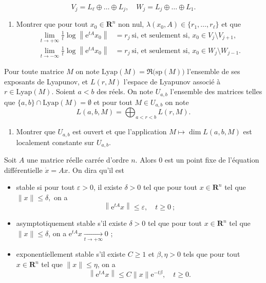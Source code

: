 \documentclass[a4paper,10pt,openany]{article}
\theoremstyle{plain}
\theoremstyle{definition}
\newcommand{\e}{\mathrm{e}}
\newcommand{\R}{\mathbf{R}}
\begin{document}
$$
V_{j} =L_{\ell} \oplus \ldots \oplus L_{j}, \quad W_{j} =L_{j} \oplus \ldots \oplus L_{1}.
$$
\begin{enumerate}[resume]
\item Montrer que pour tout $x_0 \in \R^n$ non nul, $\lambda(x_0, A) \in \{r_1, \dots, r_\ell\}$ et que
$$
\begin{aligned}
\lim_{t \to + \infty} \frac{1}{t} \log \left\|\e^{tA} x_0 \right\| &= r_j ~\text{si, et seulement si, } x_0 \in V_j \setminus V_{j+1}, \\
\lim_{t \to - \infty} \frac{1}{t} \log \left\|\e^{tA} x_0 \right\| &= r_j ~\text{si, et seulement si, } x_0 \in W_j \setminus W_{j-1}.
\end{aligned}
$$
\end{enumerate}
Pour toute matrice $M$ on note $\mathrm{Lyap}(M) = \Re\bigl(\mathrm{sp}(M)\bigr)$ l'ensemble de ses exposants de Lyapunov, et $L(r,M)$ l'espace de Lyapunov associ\'e \`a $r \in \mathrm{Lyap}(M)$. Soient $a < b$ des r\'eels. On note $U_{a,b}$ l'ensemble des matrices telles que $\{a,b\} \cap \mathrm{Lyap}(M) = \emptyset$ et pour tout $M \in U_{a,b}$ on note
$$
L(a,b,M) = \bigoplus_{a < r < b} L(r,M).
$$
\begin{enumerate}[resume]
\item Montrer que $U_{a,b}$ est ouvert et que l'application $M \mapsto \dim L(a,b,M)$ est localement constante sur $U_{a,b}$.
\iffalse
\item Montrer qu'il existe une application continue $\pi : U_{a,b} \to \mathrm{Mat}_{n \times n}(\R)$ telle que
$$
\pi(M)^2= \pi(M), \quad \mathrm{Im} ~\pi(M) = L(a,b,M), \quad M \in U_{a,b}.
$$
\fi
\end{enumerate}
\vspace{0.6cm}

 \vspace{1.5mm} 

\noindent Soit $A$ une matrice r\'eelle carr\'ee d'ordre $n$. Alors $0$ est un point fixe de l'\'equation diff\'erentielle $\dot{x} = A x$. On dira qu'il est
\begin{itemize}[label=--]
\item stable si pour tout $\varepsilon > 0$, il existe $\delta > 0$ tel que pour tout $x \in \R^n$ tel que $\|x\|\leq \delta,$ on a
$$
\left\|\e^{tA}x\right\| \leq \varepsilon, \quad t \geq 0~ ;
$$
\item asymptotiquement stable s'il existe $\delta > 0$ tel que pour tout $x \in \R^n$ tel que $\|x\|\leq\delta$, on a $\e^{tA}x \underset{t \to +\infty}{\longrightarrow} 0$ ;
\item exponentiellement stable s'il existe $C \geq 1$ et $\beta, \eta > 0$ tels que pour tout $x \in \R^n$ tel que $\|x\|\leq \eta$, on a
$$
\left\|\e^{tA}x\right\| \leq C \|x\|\e^{-t\beta}, \quad t\geq 0.
$$
\end{itemize}
\end{document}
